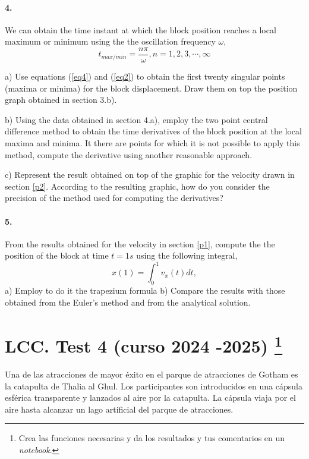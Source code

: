 \paragraph{4.} We can obtain the time instant at which the block position reaches a local maximum or minimum using the the oscillation frequency $\omega$,
\begin{equation}\label{eq4}
t_{max/min} = \frac{n \pi}{\omega}, n = 1,2,3,\cdots, \infty
\end{equation}

a) Use equations (\ref{eq4}) and (\ref{eq2}) to obtain the first twenty singular points (maxima or minima) for the block displacement. Draw them on top the position graph obtained in section 3.b).  

b) Using the data obtained in section 4.a), employ the two point central difference method to obtain the time derivatives of the block position at the local maxima and minima. It there are points for which it is not possible to apply this method, compute the derivative using another reasonable approach.

c) Represent the result obtained on top of the graphic for the velocity drawn in section \ref{p2}. According to the resulting graphic, how do you consider the precision of the method used for computing the derivatives?

\paragraph{5.} From the results obtained for the velocity in section \ref{p1}, compute the the position of the block at time $t=1s$ using the following integral,  
\begin{equation}
x(1) = \int_0^1v_x(t)dt,
\end{equation}
a) Employ to do it the trapezium formula
b) Compare the results with those obtained from the Euler's method and from the analytical solution.

\section*{LCC. Test 4 (curso 2024 -2025) \protect\footnote{Crea las funciones necesarias  y da los resultados y tus comentarios en un \emph{notebook}.}}

Una de las atracciones de mayor éxito en el parque de atracciones de Gotham es la catapulta de Thalia al Ghul. Los participantes son introducidos en una cápsula esférica transparente y lanzados al aire por la catapulta. La cápsula viaja por el aire hasta alcanzar un lago artificial del parque de atracciones.

